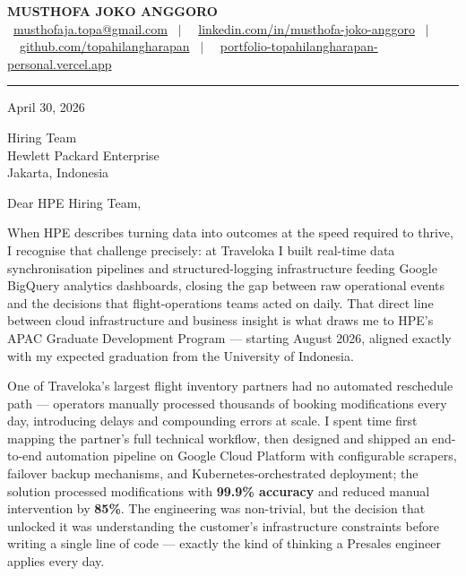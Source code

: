 \documentclass[11pt,a4paper]{article}
\begin{document}
\begin{center}
    {\LARGE \textbf{MUSTHOFA JOKO ANGGORO}} \\[4pt]
    \small
    \faEnvelope\ \href{mailto:musthofaja.topa@gmail.com}{musthofaja.topa@gmail.com}
    \ $|$ \
    \faLinkedin\ \href{https://www.linkedin.com/in/musthofa-joko-anggoro/}{linkedin.com/in/musthofa-joko-anggoro}
    \ $|$ \
    \faGithub\ \href{https://github.com/topahilangharapan}{github.com/topahilangharapan}
    \ $|$ \
    \faGlobe\ \href{https://portfolio-topahilangharapan-personal.vercel.app/}{portfolio-topahilangharapan-personal.vercel.app}
\end{center}

\vspace{4pt}\hrule\vspace{14pt}

April 30, 2026

\vspace{6pt}
Hiring Team \\
Hewlett Packard Enterprise \\
Jakarta, Indonesia

\vspace{6pt}
Dear HPE Hiring Team,

When HPE describes turning data into outcomes at the speed required to thrive,
I recognise that challenge precisely: at Traveloka I built real-time data synchronisation
pipelines and structured-logging infrastructure feeding Google BigQuery analytics
dashboards, closing the gap between raw operational events and the decisions
that flight-operations teams acted on daily.
That direct line between cloud infrastructure and business insight is what draws
me to HPE's APAC Graduate Development Program --- starting August 2026,
aligned exactly with my expected graduation from the University of Indonesia.

One of Traveloka's largest flight inventory partners had no automated reschedule
path --- operators manually processed thousands of booking modifications every day,
introducing delays and compounding errors at scale.
I spent time first mapping the partner's full technical workflow, then designed
and shipped an end-to-end automation pipeline on Google Cloud Platform with
configurable scrapers, failover backup mechanisms, and Kubernetes-orchestrated
deployment; the solution processed modifications with \textbf{99.9\% accuracy} and
reduced manual intervention by \textbf{85\%}.
The engineering was non-trivial, but the decision that unlocked it was understanding
the customer's infrastructure constraints before writing a single line of code ---
exactly the kind of thinking a Presales engineer applies every day.
\end{document}
